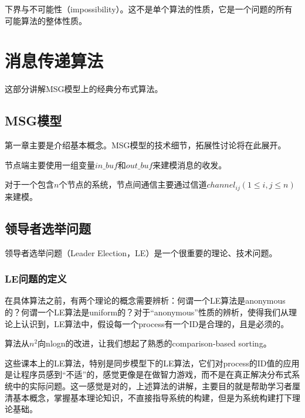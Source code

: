 \documentclass[UTF8]{ctexrep}
\begin{document}
下界与不可能性（impossibility）。这不是单个算法的性质，它是一个问题的所有可能算法的整体性质。



\part{消息传递算法} 

这部分讲解MSG模型上的经典分布式算法。


\chapter{MSG模型} \label{Chap_MSG}

第一章主要是介绍基本概念。MSG模型的技术细节，拓展性讨论将在此展开。

节点端主要使用一组变量$in\_buf$和$out\_buf$来建模消息的收发。

对于一个包含$n$个节点的系统，节点间通信主要通过信道$channel_{ij} (1\leq i, j \leq n)$来建模。



\chapter{领导者选举问题}

领导者选举问题（Leader Election，LE）是一个很重要的理论、技术问题。

\section{LE问题的定义}

在具体算法之前，有两个理论的概念需要辨析：何谓一个LE算法是anonymous的？何谓一个LE算法是uniform的？对于“anonymous”性质的辨析，使得我们从理论上认识到，LE算法中，假设每一个process有一个ID是合理的，且是必须的。

算法从$n^2$向nlogn的改进，让我们想起了熟悉的comparison-based sorting。

这些课本上的LE算法，特别是同步模型下的LE算法，它们对process的ID值的应用是让程序员感到“不适”的，感觉更像是在做智力游戏，而不是在真正解决分布式系统中的实际问题。这一感觉是对的，上述算法的讲解，主要目的就是帮助学习者厘清基本概念，掌握基本理论知识，不直接指导系统的构建，但是为系统构建打下理论基础。
\end{document}
